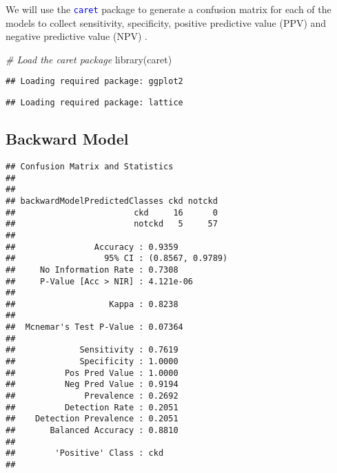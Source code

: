 \documentclass[
]{article}
\newenvironment{Shaded}{\begin{snugshade}}{\end{snugshade}}
\newcommand{\CommentTok}[1]{\textcolor[rgb]{0.56,0.35,0.01}{\textit{#1}}}
\newcommand{\FunctionTok}[1]{\textcolor[rgb]{0.00,0.00,0.00}{#1}}
\newcommand{\NormalTok}[1]{#1}
\newcommand{\SpecialCharTok}[1]{\textcolor[rgb]{0.00,0.00,0.00}{#1}}
\begin{document}
We will use the \textcolor{blue}{\texttt{caret}} package to generate a
confusion matrix for each of the models to collect sensitivity,
specificity, positive predictive value (PPV) and negative predictive
value (NPV) \autocite{Kuhn2008}.

\begin{Shaded}
\begin{Highlighting}[]
\CommentTok{\# Load the caret package}
\FunctionTok{library}\NormalTok{(caret)}
\end{Highlighting}
\end{Shaded}

\begin{verbatim}
## Loading required package: ggplot2
\end{verbatim}

\begin{verbatim}
## Loading required package: lattice
\end{verbatim}

\hypertarget{backward-model-1}{%
\subsection{Backward Model}\label{backward-model-1}}

\begin{Shaded}
\end{Shaded}

\begin{verbatim}
## Confusion Matrix and Statistics
## 
##                              
## backwardModelPredictedClasses ckd notckd
##                        ckd     16      0
##                        notckd   5     57
##                                           
##                Accuracy : 0.9359          
##                  95% CI : (0.8567, 0.9789)
##     No Information Rate : 0.7308          
##     P-Value [Acc > NIR] : 4.121e-06       
##                                           
##                   Kappa : 0.8238          
##                                           
##  Mcnemar's Test P-Value : 0.07364         
##                                           
##             Sensitivity : 0.7619          
##             Specificity : 1.0000          
##          Pos Pred Value : 1.0000          
##          Neg Pred Value : 0.9194          
##              Prevalence : 0.2692          
##          Detection Rate : 0.2051          
##    Detection Prevalence : 0.2051          
##       Balanced Accuracy : 0.8810          
##                                           
##        'Positive' Class : ckd             
## 
\end{verbatim}
\end{document}
